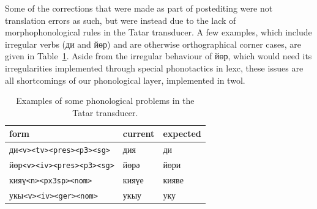 \documentclass[a4paper,11pt]{article}
\newcommand{\tag}[1]{{\small{\texttt{#1}}}}
\begin{document}
Some of the corrections that were made as part of postediting were not translation errors as such, but were instead due to the lack of morphophonological rules in the Tatar transducer.  A few examples, which include irregular verbs (ди and йөр) and are otherwise orthographical corner cases, are given in Table~\ref{tab:phonerrors}.  Aside from the irregular behaviour of йөр, which would need its irregularities implemented through special phonotactics in lexc, these issues are all shortcomings of our phonological layer, implemented in twol.

\begin{table}
	\centering
	\begin{tabular}{lll}
		\toprule
		form & current & expected \\\midrule
		ди\tag{<v>}\tag{<tv>}\tag{<pres>}\tag{<p3>}\tag{<sg>} & дия & ди \\
		йөр\tag{<v>}\tag{<iv>}\tag{<pres>}\tag{<p3>}\tag{<sg>} & йөрә & йөри \\
		кияү\tag{<n>}\tag{<px3sp>}\tag{<nom>} & кияүе & кияве \\
		укы\tag{<v>}\tag{<iv>}\tag{<ger>}\tag{<nom>} & укыу & уку \\\bottomrule
	\end{tabular}
	\caption{Examples of some phonological problems in the Tatar transducer.}
	\label{tab:phonerrors}
\end{table}




\end{document}
